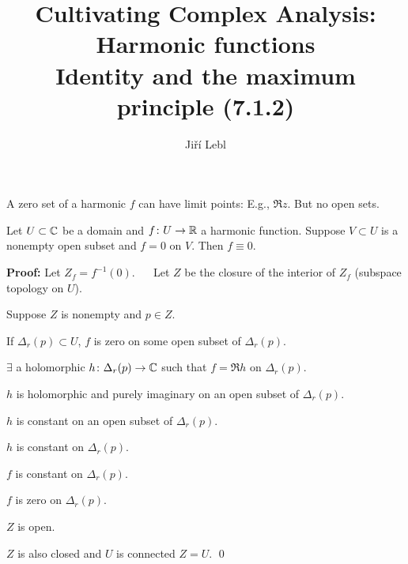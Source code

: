 \documentclass[10pt,aspectratio=169]{beamer}
\author{Ji\v{r}\'i Lebl}
\institute[OSU]{%
Departemento pri Matematiko de Oklahoma {\^S}tata Universitato}
\title{Cultivating Complex Analysis:\\%
Harmonic functions\\%
Identity and the maximum principle (7.1.2)}
\date{}
\begin{document}
\begin{frame}
\titlepage
\end{frame}

\begin{frame}
A zero set of a harmonic $f$ can have limit points: E.g., $\Re z$.
But no open sets.

\pause

\begin{theorem}[Identity]
Let $U \subset {\mathbb{C}}$ be a domain and $f \colon U \to {\mathbb{R}}$ a harmonic function.
Suppose $V \subset U$ is a nonempty open subset and $f = 0$ on $V$.  Then $f
\equiv 0$.
\end{theorem}

\pause
\textbf{Proof:}
Let $Z_f = f^{-1}(0)$.
\pause
~~
Let $Z$ be the closure of the interior of $Z_f$ (subspace topology on $U$).

\medskip
\pause

Suppose $Z$ is nonempty and $p \in Z$.
\pause

If $\Delta_r(p) \subset U$, $f$ is
zero on some open subset of $\Delta_r(p)$.

\pause
\medskip

$\exists$ a holomorphic $h \colon \Delta_r(p) \to {\mathbb{C}}$ such that $f = \Re h$
on $\Delta_r(p)$.

\pause
\thus\quad
$h$ is holomorphic and purely imaginary on an open subset of
$\Delta_r(p)$.

\pause
\thus\quad
$h$ is constant on an open subset of $\Delta_r(p)$.

\pause
\thus\quad
$h$ is constant on $\Delta_r(p)$.

\pause
\thus\quad
$f$ is constant on $\Delta_r(p)$.

\pause
\thus\quad
$f$ is zero on $\Delta_r(p)$.

\pause
\thus\quad
$Z$ is open.

\pause
\medskip

$Z$ is also closed and $U$ is connected \wthus $Z=U$.
\qed
\end{frame}
\end{document}
